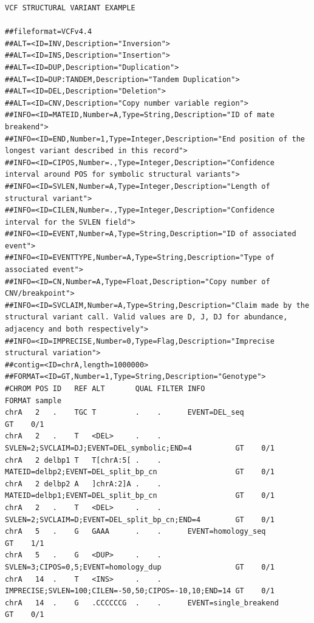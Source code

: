 \documentclass[8pt]{article}
\begin{document}
\pagebreak
\footnotesize
\begin{landscape}
\begin{verbatim}
VCF STRUCTURAL VARIANT EXAMPLE

##fileformat=VCFv4.4
##ALT=<ID=INV,Description="Inversion">
##ALT=<ID=INS,Description="Insertion">
##ALT=<ID=DUP,Description="Duplication">
##ALT=<ID=DUP:TANDEM,Description="Tandem Duplication">
##ALT=<ID=DEL,Description="Deletion">
##ALT=<ID=CNV,Description="Copy number variable region">
##INFO=<ID=MATEID,Number=A,Type=String,Description="ID of mate breakend">
##INFO=<ID=END,Number=1,Type=Integer,Description="End position of the longest variant described in this record">
##INFO=<ID=CIPOS,Number=.,Type=Integer,Description="Confidence interval around POS for symbolic structural variants">
##INFO=<ID=SVLEN,Number=A,Type=Integer,Description="Length of structural variant">
##INFO=<ID=CILEN,Number=.,Type=Integer,Description="Confidence interval for the SVLEN field">
##INFO=<ID=EVENT,Number=A,Type=String,Description="ID of associated event">
##INFO=<ID=EVENTTYPE,Number=A,Type=String,Description="Type of associated event">
##INFO=<ID=CN,Number=A,Type=Float,Description="Copy number of CNV/breakpoint">
##INFO=<ID=SVCLAIM,Number=A,Type=String,Description="Claim made by the structural variant call. Valid values are D, J, DJ for abundance, adjacency and both respectively">
##INFO=<ID=IMPRECISE,Number=0,Type=Flag,Description="Imprecise structural variation">
##contig=<ID=chrA,length=1000000>
##FORMAT=<ID=GT,Number=1,Type=String,Description="Genotype">
#CHROM POS ID   REF ALT       QUAL FILTER INFO                                             FORMAT sample
chrA   2   .    TGC T         .    .      EVENT=DEL_seq                                        GT    0/1
chrA   2   .    T   <DEL>     .    .      SVLEN=2;SVCLAIM=DJ;EVENT=DEL_symbolic;END=4          GT    0/1
chrA   2 delbp1 T   T[chrA:5[ .    .      MATEID=delbp2;EVENT=DEL_split_bp_cn                  GT    0/1
chrA   2 delbp2 A   ]chrA:2]A .    .      MATEID=delbp1;EVENT=DEL_split_bp_cn                  GT    0/1
chrA   2   .    T   <DEL>     .    .      SVLEN=2;SVCLAIM=D;EVENT=DEL_split_bp_cn;END=4        GT    0/1
chrA   5   .    G   GAAA      .    .      EVENT=homology_seq                                   GT    1/1
chrA   5   .    G   <DUP>     .    .      SVLEN=3;CIPOS=0,5;EVENT=homology_dup                 GT    0/1
chrA   14  .    T   <INS>     .    .      IMPRECISE;SVLEN=100;CILEN=-50,50;CIPOS=-10,10;END=14 GT    0/1
chrA   14  .    G   .CCCCCCG  .    .      EVENT=single_breakend                                GT    0/1
\end{verbatim}
\end{landscape}
\pagebreak
\normalsize
\end{document}
